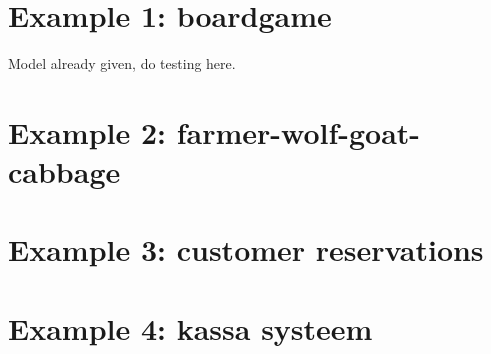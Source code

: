 \section{Example 1: boardgame}
Model already given, do testing here.

\section{Example 2: farmer-wolf-goat-cabbage}

\section{Example 3: customer reservations}

\section{Example 4: kassa systeem}

